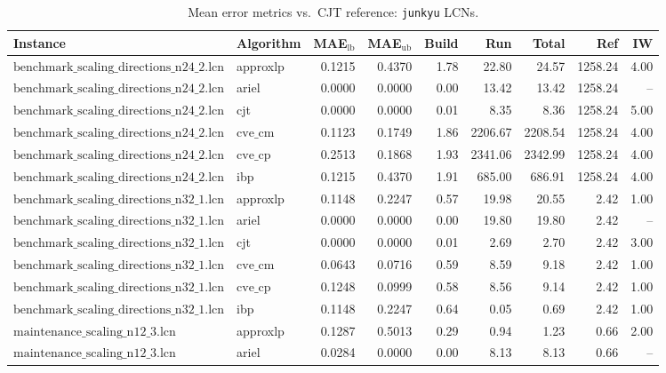 \documentclass{article}
\begin{document}
\begin{table}[ht]
\centering
\scriptsize
\caption{Mean error metrics vs.\ CJT reference: \texttt{junkyu} LCNs.}
\begin{tabular}{llrrrrrrr}
\toprule
Instance & Algorithm & MAE$_{\text{lb}}$ & MAE$_{\text{ub}}$ & Build & Run & Total & Ref & IW \\
\midrule
$\text{benchmark\_scaling\_directions\_n24\_2.lcn}$ & approxlp & 0.1215 & 0.4370 & 1.78 & 22.80 & 24.57 & 1258.24 & 4.00 \\
$\text{benchmark\_scaling\_directions\_n24\_2.lcn}$ & ariel & 0.0000 & 0.0000 & 0.00 & 13.42 & 13.42 & 1258.24 & -- \\
$\text{benchmark\_scaling\_directions\_n24\_2.lcn}$ & cjt & 0.0000 & 0.0000 & 0.01 & 8.35 & 8.36 & 1258.24 & 5.00 \\
$\text{benchmark\_scaling\_directions\_n24\_2.lcn}$ & $\text{cve\_cm}$ & 0.1123 & 0.1749 & 1.86 & 2206.67 & 2208.54 & 1258.24 & 4.00 \\
$\text{benchmark\_scaling\_directions\_n24\_2.lcn}$ & $\text{cve\_cp}$ & 0.2513 & 0.1868 & 1.93 & 2341.06 & 2342.99 & 1258.24 & 4.00 \\
$\text{benchmark\_scaling\_directions\_n24\_2.lcn}$ & ibp & 0.1215 & 0.4370 & 1.91 & 685.00 & 686.91 & 1258.24 & 4.00 \\
\hline
$\text{benchmark\_scaling\_directions\_n32\_1.lcn}$ & approxlp & 0.1148 & 0.2247 & 0.57 & 19.98 & 20.55 & 2.42 & 1.00 \\
$\text{benchmark\_scaling\_directions\_n32\_1.lcn}$ & ariel & 0.0000 & 0.0000 & 0.00 & 19.80 & 19.80 & 2.42 & -- \\
$\text{benchmark\_scaling\_directions\_n32\_1.lcn}$ & cjt & 0.0000 & 0.0000 & 0.01 & 2.69 & 2.70 & 2.42 & 3.00 \\
$\text{benchmark\_scaling\_directions\_n32\_1.lcn}$ & $\text{cve\_cm}$ & 0.0643 & 0.0716 & 0.59 & 8.59 & 9.18 & 2.42 & 1.00 \\
$\text{benchmark\_scaling\_directions\_n32\_1.lcn}$ & $\text{cve\_cp}$ & 0.1248 & 0.0999 & 0.58 & 8.56 & 9.14 & 2.42 & 1.00 \\
$\text{benchmark\_scaling\_directions\_n32\_1.lcn}$ & ibp & 0.1148 & 0.2247 & 0.64 & 0.05 & 0.69 & 2.42 & 1.00 \\
\hline
$\text{maintenance\_scaling\_n12\_3.lcn}$ & approxlp & 0.1287 & 0.5013 & 0.29 & 0.94 & 1.23 & 0.66 & 2.00 \\
$\text{maintenance\_scaling\_n12\_3.lcn}$ & ariel & 0.0284 & 0.0000 & 0.00 & 8.13 & 8.13 & 0.66 & -- \\

\end{tabular}
\end{table}
\end{document}
